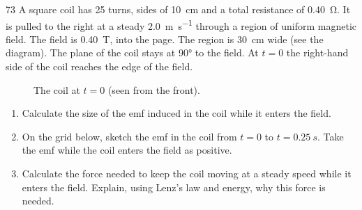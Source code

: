 \begin{practiceq}{7}{3}\label{pq:coilpull}
A square coil has 25 turns, sides of \qty{10}{cm} and a total resistance of \qty{0.40}{\ohm}.
It is pulled to the right at a steady \qty{2.0}{m.s^{-1}} through a region of uniform
magnetic field. The field is \qty{0.40}{T}, into the page. The region is \qty{30}{cm} wide
(see the diagram). The plane of the coil stays at \ang{90} to the field. At $t = 0$ the
right-hand side of the coil reaches the edge of the field.
\begin{figure}
  \centering
  \caption*{The coil at $t = 0$ (seen from the front).}
\end{figure}
\begin{enumerate}[label=(\alph*)]
  \item Calculate the size of the emf induced in the coil while it enters the field.
  \item On the grid below, sketch the emf in the coil from $t = 0$ to $t = \qty{0.25}{s}$.
        Take the emf while the coil enters the field as positive. 
  \item Calculate the force needed to keep the coil moving at a steady speed while it enters
        the field. Explain, using Lenz's law and energy, why this force is needed.
\end{enumerate}
\begin{figure}
  \centering
  \begin{tikzpicture}

\end{tikzpicture}
\end{figure}
\end{practiceq}

